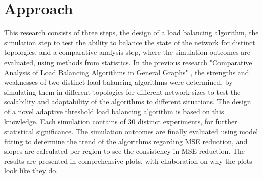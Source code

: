 \section{Approach}\label{sec:approach}
This research consists of three steps, the design of a load balancing algorithm, the simulation step to test the ability to balance the state of the network for distinct topologies, and a comparative analysis step, where the simulation outcomes are evaluated, using methods from statistics. In the previous research "Comparative Analysis of Load Balancing Algorithms in General Graphs" \cite{Bayazitoglu}, the strengths and weaknesses of two distinct load balancing algorithms were determined, by simulating them in different topologies for different network sizes to test the scalability and adaptability of the algorithms to different situations. The design of a novel adaptive threshold load balancing algorithm is based on this knowledge. Each simulation contains of 30 distinct experiments, for further statistical significance. The simulation outcomes are finally evaluated using model fitting to determine the trend of the algorithms regarding MSE reduction, and slopes are calculated per region to see the consistency in MSE reduction. The results are presented in comprehensive plots, with ellaboration on why the plots look like they do.
